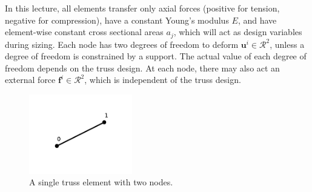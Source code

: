 In this lecture, all elements transfer only axial forces (positive for tension, negative for compression), have a constant Young's modulus $E$, and have element-wise constant cross sectional areas $a_j$, which will act as design variables during sizing. Each node has two degrees of freedom to deform $\mathbf{u}^i \in \mathcal{R}^2$, unless a degree of freedom is constrained by a support. The actual value of each degree of freedom depends on the truss design. At each node, there may also act an external force $\mathbf{f}^i \in \mathcal{R}^2$, which is independent of the truss design.

\begin{figure}[!htpb]
    \centering
    \includegraphics[width=0.4\textwidth]{figures/single_truss.pdf}
    \caption{A single truss element with two nodes.}
    \label{fig:single_truss}
\end{figure}


